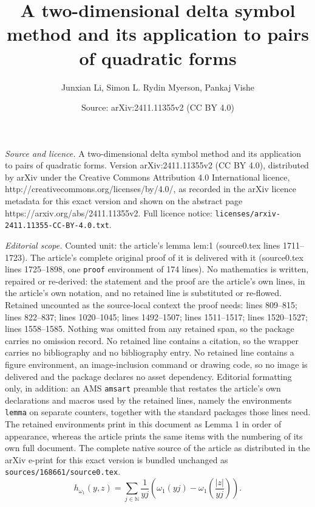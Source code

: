 \documentclass[10pt,a4paper]{amsart}
\title{A two-dimensional delta symbol method and its application to pairs of quadratic forms}
\author{Junxian Li, Simon L. Rydin Myerson, Pankaj Vishe}
\date{Source: arXiv:2411.11355v2 (CC BY 4.0)}
\newcommand{\N}{\mathbb{N}}
\begin{document}
\maketitle

\noindent\emph{Source and licence.} A two-dimensional delta symbol method and its application to pairs of quadratic forms. Version arXiv:2411.11355v2 (CC BY 4.0), distributed by arXiv under the Creative Commons Attribution 4.0 International licence, http://creativecommons.org/licenses/by/4.0/, as recorded in the arXiv licence metadata for this exact version and shown on the abstract page https://arxiv.org/abs/2411.11355v2. Full licence notice: \texttt{licenses/arxiv-2411.11355-CC-BY-4.0.txt}.\par\smallskip

\noindent\textit{Editorial scope.} Counted unit: the article's lemma lem:1 (source0.tex lines 1711--1723). The article's complete original proof of it is delivered with it (source0.tex lines 1725--1898, one \texttt{proof} environment of 174 lines). No mathematics is written, repaired or re-derived: the statement and the proof are the article's own lines, in the article's own notation, and no retained line is substituted or re-flowed.  Retained uncounted as the source-local context the proof needs: lines 809--815; lines 822--837; lines 1020--1045; lines 1492--1507; lines 1511--1517; lines 1520--1527; lines 1558--1585.  Nothing was omitted from any retained span, so the package carries no omission record.  No retained line contains a citation, so the wrapper carries no bibliography and no bibliography entry.  No retained line contains a figure environment, an image-inclusion command or drawing code, so no image is delivered and the package declares no asset dependency.  Editorial formatting only, in addition: an AMS \texttt{amsart} preamble that restates the article's own declarations and macros used by the retained lines, namely the environments \texttt{lemma} on separate counters, together with the standard packages those lines need.  The retained environments print in this document as Lemma 1 in order of appearance, whereas the article prints the same items with the numbering of its own full document.  The complete native source of the article as distributed in the arXiv e-print for this exact version is bundled unchanged as \texttt{sources/168661/source0.tex}.
\begin{equation}
	\label{eq:hyzdef}
	h_{\omega_1}(y,z)
	=
	\sum_{j\in\N}
	\frac{1}{yj}\left(\omega_1(yj)-\omega_1\left(\frac{|z|}{yj}\right)\right).
\end{equation}
\end{document}
